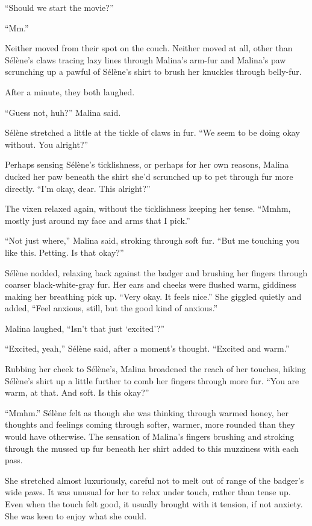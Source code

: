 ``Should we start the movie?''

``Mm.''

Neither moved from their spot on the couch. Neither moved at all, other than Sélène's claws tracing lazy lines through Malina's arm-fur and Malina's paw scrunching up a pawful of Sélène's shirt to brush her knuckles through belly-fur.

After a minute, they both laughed.

``Guess not, huh?'' Malina said.

Sélène stretched a little at the tickle of claws in fur. ``We seem to be doing okay without. You alright?''

Perhaps sensing Sélène's ticklishness, or perhaps for her own reasons, Malina ducked her paw beneath the shirt she'd scrunched up to pet through fur more directly. ``I'm okay, dear. This alright?''

The vixen relaxed again, without the ticklishness keeping her tense. ``Mmhm, mostly just around my face and arms that I pick.''

``Not just where,'' Malina said, stroking through soft fur. ``But me touching you like this. Petting. Is that okay?''

Sélène nodded, relaxing back against the badger and brushing her fingers through coarser black-white-gray fur. Her ears and cheeks were flushed warm, giddiness making her breathing pick up. ``Very okay. It feels nice.'' She giggled quietly and added, ``Feel anxious, still, but the good kind of anxious.''

Malina laughed, ``Isn't that just `excited'?''

``Excited, yeah,'' Sélène said, after a moment's thought. ``Excited and warm.''

Rubbing her cheek to Sélène's, Malina broadened the reach of her touches, hiking Sélène's shirt up a little further to comb her fingers through more fur. ``You are warm, at that. And soft. Is this okay?''

``Mmhm.'' Sélène felt as though she was thinking through warmed honey, her thoughts and feelings coming through softer, warmer, more rounded than they would have otherwise. The sensation of Malina's fingers brushing and stroking through the mussed up fur beneath her shirt added to this muzziness with each pass.

She stretched almost luxuriously, careful not to melt out of range of the badger's wide paws. It was unusual for her to relax under touch, rather than tense up. Even when the touch felt good, it usually brought with it tension, if not anxiety. She was keen to enjoy what she could.


